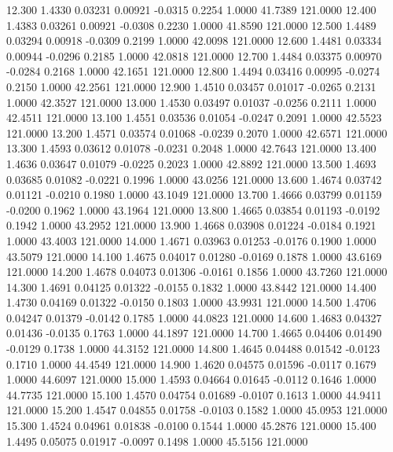   12.300   1.4330   0.03231   0.00921  -0.0315   0.2254   1.0000  41.7389 121.0000
  12.400   1.4383   0.03261   0.00921  -0.0308   0.2230   1.0000  41.8590 121.0000
  12.500   1.4489   0.03294   0.00918  -0.0309   0.2199   1.0000  42.0098 121.0000
  12.600   1.4481   0.03334   0.00944  -0.0296   0.2185   1.0000  42.0818 121.0000
  12.700   1.4484   0.03375   0.00970  -0.0284   0.2168   1.0000  42.1651 121.0000
  12.800   1.4494   0.03416   0.00995  -0.0274   0.2150   1.0000  42.2561 121.0000
  12.900   1.4510   0.03457   0.01017  -0.0265   0.2131   1.0000  42.3527 121.0000
  13.000   1.4530   0.03497   0.01037  -0.0256   0.2111   1.0000  42.4511 121.0000
  13.100   1.4551   0.03536   0.01054  -0.0247   0.2091   1.0000  42.5523 121.0000
  13.200   1.4571   0.03574   0.01068  -0.0239   0.2070   1.0000  42.6571 121.0000
  13.300   1.4593   0.03612   0.01078  -0.0231   0.2048   1.0000  42.7643 121.0000
  13.400   1.4636   0.03647   0.01079  -0.0225   0.2023   1.0000  42.8892 121.0000
  13.500   1.4693   0.03685   0.01082  -0.0221   0.1996   1.0000  43.0256 121.0000
  13.600   1.4674   0.03742   0.01121  -0.0210   0.1980   1.0000  43.1049 121.0000
  13.700   1.4666   0.03799   0.01159  -0.0200   0.1962   1.0000  43.1964 121.0000
  13.800   1.4665   0.03854   0.01193  -0.0192   0.1942   1.0000  43.2952 121.0000
  13.900   1.4668   0.03908   0.01224  -0.0184   0.1921   1.0000  43.4003 121.0000
  14.000   1.4671   0.03963   0.01253  -0.0176   0.1900   1.0000  43.5079 121.0000
  14.100   1.4675   0.04017   0.01280  -0.0169   0.1878   1.0000  43.6169 121.0000
  14.200   1.4678   0.04073   0.01306  -0.0161   0.1856   1.0000  43.7260 121.0000
  14.300   1.4691   0.04125   0.01322  -0.0155   0.1832   1.0000  43.8442 121.0000
  14.400   1.4730   0.04169   0.01322  -0.0150   0.1803   1.0000  43.9931 121.0000
  14.500   1.4706   0.04247   0.01379  -0.0142   0.1785   1.0000  44.0823 121.0000
  14.600   1.4683   0.04327   0.01436  -0.0135   0.1763   1.0000  44.1897 121.0000
  14.700   1.4665   0.04406   0.01490  -0.0129   0.1738   1.0000  44.3152 121.0000
  14.800   1.4645   0.04488   0.01542  -0.0123   0.1710   1.0000  44.4549 121.0000
  14.900   1.4620   0.04575   0.01596  -0.0117   0.1679   1.0000  44.6097 121.0000
  15.000   1.4593   0.04664   0.01645  -0.0112   0.1646   1.0000  44.7735 121.0000
  15.100   1.4570   0.04754   0.01689  -0.0107   0.1613   1.0000  44.9411 121.0000
  15.200   1.4547   0.04855   0.01758  -0.0103   0.1582   1.0000  45.0953 121.0000
  15.300   1.4524   0.04961   0.01838  -0.0100   0.1544   1.0000  45.2876 121.0000
  15.400   1.4495   0.05075   0.01917  -0.0097   0.1498   1.0000  45.5156 121.0000
